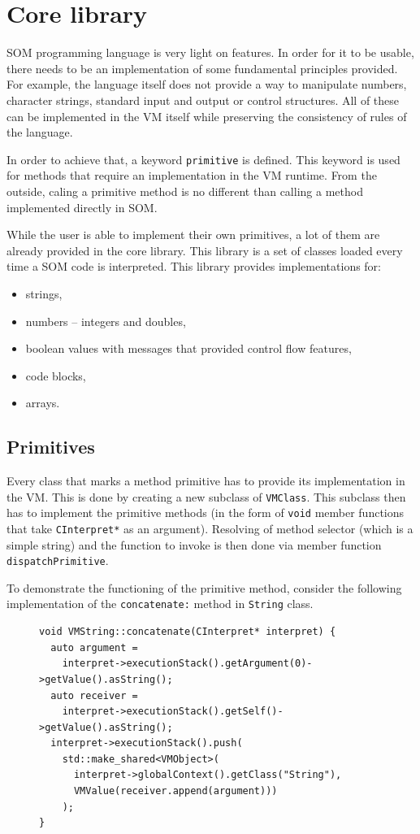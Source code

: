\documentclass[thesis=M,english]{FITthesis}[2019/12/23]
\begin{document}
\section{Core library}
SOM programming language is very light on features. In order for it to be usable, there needs to be an implementation of some fundamental principles provided.
For example, the language itself does not provide a way to manipulate numbers, character strings, standard input and output or control structures. All of these
can be implemented in the VM itself while preserving the consistency of rules of the language.

In order to achieve that, a keyword \texttt{primitive} is defined. This keyword is used for methods that require an implementation in the VM runtime. From the outside,
caling a primitive method is no different than calling a method implemented directly in SOM.

While the user is able to implement their own primitives, a lot of them are already provided in the core library. This library is a set of classes loaded every time
a SOM code is interpreted. This library provides implementations for:
\begin{itemize}
	\item strings,
	\item numbers -- integers and doubles,
	\item boolean values with messages that provided control flow features,
	\item code blocks,
	\item arrays.
\end{itemize}

\subsection{Primitives}
\label{subsection:primitives}
Every class that marks a method primitive has to provide its implementation in the VM. This is done by creating a new subclass of \texttt{VMClass}. This subclass
then has to implement the primitive methods (in the form of \texttt{void} member functions that take \texttt{CInterpret*} as an argument). Resolving of method
selector (which is a simple string) and the function to invoke is then done via member function \texttt{dispatchPrimitive}.

To demonstrate the functioning of the primitive method, consider the following implementation of the \texttt{concatenate:} method in \texttt{String} class.
\begin{figure}[h!]
	\centering
	\begin{verbatim}
void VMString::concatenate(CInterpret* interpret) {
  auto argument = 
    interpret->executionStack().getArgument(0)->getValue().asString();
  auto receiver = 
    interpret->executionStack().getSelf()->getValue().asString();
  interpret->executionStack().push(
    std::make_shared<VMObject>(
      interpret->globalContext().getClass("String"), 
      VMValue(receiver.append(argument)))
    );
}
	\end{verbatim}

\end{figure}
\end{document}
